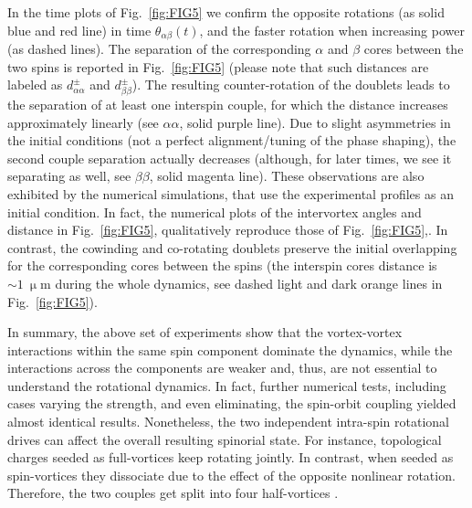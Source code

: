 \documentclass[aps,prb,twocolumn,superscriptaddress,nofootinbib]{revtex4}
\def\editr#1{#1}
\def\refer#1{#1}
\def\edstrike#1{}
\begin{document}
In the time plots of Fig.~\ref{fig:FIG5} we confirm the opposite rotations
(as solid blue and red line) in time
$\theta_{\alpha\beta}(t)$, and the faster rotation when increasing power (as dashed lines).
%
The separation of the corresponding $\alpha$ and $\beta$ \edstrike{charges} \editr{cores} between the two spins
is reported in Fig.~\ref{fig:FIG5} (\editr{please note that such} distances are labeled as $d_{\alpha\alpha}^{\pm}$
and $d_{\beta\beta}^{\pm}$).
The resulting counter-rotation of the doublets
leads to the separation of at least one interspin couple, for which the distance increases
approximately linearly (see $\alpha\alpha$, solid purple line).
Due to slight asymmetries in the initial conditions (not a perfect alignment/tuning of the phase shaping),
the second couple separation actually decreases
(although, for later times,
we see it separating as well,
see $\beta\beta$, solid magenta line).
These observations are also exhibited by the
numerical simulations,
that use the experimental profiles as an initial condition.
In fact, the numerical plots of the intervortex angles
and distance in Fig.~\ref{fig:FIG5}, qualitatively reproduce those of Fig.~\ref{fig:FIG5},.
In contrast, the cowinding and co-rotating doublets preserve
the initial overlapping for the corresponding cores between the spins (the interspin
cores distance is $\sim1~\upmu\text{m}$ during the whole dynamics, see dashed
light and dark orange lines in Fig.~\ref{fig:FIG5}).
%

In summary, the above set of experiments show that
the vortex-vortex interactions within the same spin component
dominate the dynamics,
while the interactions across the components are weaker and, thus,
are not essential to understand the rotational dynamics.
In fact,
further numerical tests, including cases varying the
strength, and even eliminating, the spin-orbit coupling yielded
almost identical results.
%
Nonetheless, the two independent intra-spin rotational drives
can affect the overall resulting spinorial state.
For instance, topological charges \edstrike{imprinted} \refer{seeded} as
full-vortices keep rotating jointly. 
%
In contrast, when \edstrike{imprinted} \refer{seeded} as spin-vortices
they dissociate due to the effect of the opposite nonlinear rotation.
Therefore, the two couples get split into four \editr{half-vortices} \edstrike{baby-skyrmions}
\cite{Rubo2007,Manni2013,donati_twist_2016,dominici_vortex_2015}.\\
%
\end{document}
